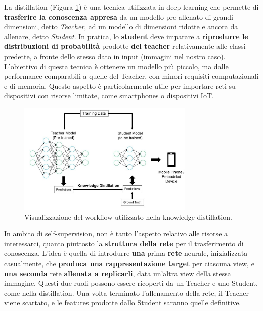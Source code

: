 La distillation (Figura \ref{fig:distillation}) è una tecnica utilizzata in deep learning che permette di \textbf{trasferire la conoscenza appresa} da un modello pre-allenato di grandi dimensioni, detto \textit{Teacher}, ad un modello di dimensioni ridotte e ancora da allenare, detto \textit{Student}. In pratica, lo \textbf{student} deve imparare a \textbf{riprodurre le distribuzioni di probabilità} prodotte \textbf{del teacher} relativamente alle classi predette, a fronte dello stesso dato in input (immagini nel nostro caso). L'obiettivo di questa tecnica è ottenere un modello più piccolo, ma dalle performance comparabili a quelle del Teacher, con minori requisiti computazionali e di memoria. Questo aspetto è particolarmente utile per importare reti su dispositivi con risorse limitate, come smartphones o dispositivi IoT.

\begin{figure}[t]
    \centering
    \includegraphics[width=0.75\textwidth]{Immagini/ssl/distillation.jpg}
    \caption{Visualizzazione del workflow utilizzato nella knowledge distillation.}
    \label{fig:distillation}
\end{figure}

In ambito di self-supervision, non è tanto l'aspetto relativo alle risorse a interessarci, quanto piuttosto la \textbf{struttura della rete} per il trasferimento di conoscenza. L'idea è quella di introdurre \textbf{una} prima \textbf{rete} neurale, inizializzata casualmente, che \textbf{produca una rappresentazione target} per ciascuna view, e \textbf{una seconda} rete \textbf{allenata a replicarli}, data un'altra view della stessa immagine. Questi due ruoli possono essere ricoperti da un Teacher e uno Student, come nella distillation. Una volta terminato l'allenamento della rete, il Teacher viene scartato, e le features prodotte dallo Student saranno quelle definitive.

